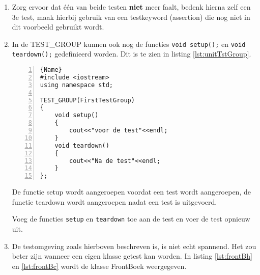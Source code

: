 \begin{enumerate}[label=(\Alph*)]
	\item 
Zorg ervoor dat één van beide testen \textbf{niet} meer faalt, bedenk hierna zelf een 3e test, maak hierbij gebruik van een testkeyword (assertion) die nog niet in dit voorbeeld gebruikt wordt.

\item 
In de TEST\_GROUP kunnen ook nog de functies \texttt{void setup();} en \texttt{void teardown();} gedefinieerd worden. Dit is te zien in listing \ref{lst:unitTstGroup}.
\begin{lstlisting}[caption= De TEST\_GROUP met de \textit{setup} en \textit{teardown} functies. ,frame=trbl,firstnumber=1,numbers=left,label={lst:unitTstGroup}]{Name}
#include <iostream>
using namespace std;

TEST_GROUP(FirstTestGroup)
{
	void setup() 
	{
		cout<<"voor de test"<<endl;
	}    
	void teardown()
	{
		cout<<"Na de test"<<endl;
	}
};
\end{lstlisting}
De functie setup wordt aangeroepen voordat een test wordt aangeroepen, de functie teardown wordt aangeroepen nadat een test is uitgevoerd.

Voeg de functies \texttt{setup} en \texttt{teardown} toe aan de test en voer de test opnieuw uit.

\item 
De testomgeving zoals hierboven beschreven is, is niet echt spannend. Het zou beter zijn wanneer een eigen klasse getest kan worden. In listing \ref{lst:frontBh} en \ref{lst:frontBc} wordt de klasse FrontBoek weergegeven.


\end{enumerate}
